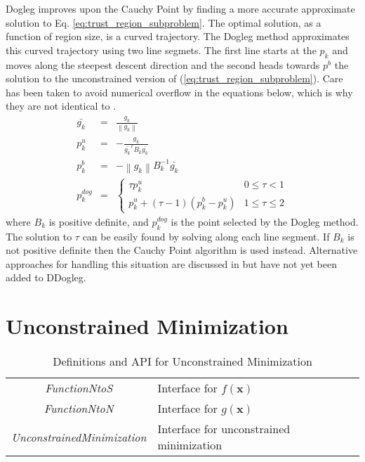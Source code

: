 \documentclass[peerreview,onecolumn]{IEEEtran}
\newcommand{\norm}[1]{\left\lVert#1\right\rVert}
\begin{document}
Dogleg improves upon the Cauchy Point by finding a more accurate approximate solution to Eq. \ref{eq:trust_region_subproblem}. The optimal solution, as a function of region size, is a curved trajectory. The Dogleg method approximates this curved trajectory using two line segmets. The first line starts at the $p_k$ and moves along the steepest descent direction and the second heads towards $p^b$ the solution to the unconstrained version of (\ref{eq:trust_region_subproblem}). Care has been taken to avoid numerical overflow in the equations below, which is why they are not identical to \cite{numopt2006,IMM2004}.
\begin{eqnarray}
\bar{g_k} &=& \frac{g_k}{\norm{g_k}} \\
p^u_k &=& -\frac{g_k}{\bar{g_k}^T B_k \bar{g_k}} \\
p^b_k &=& -\norm{g_k}B^{-1}_k\bar{g_k} \\
p^{dog}_k &=&
\begin{cases}
	\tau p^u_k & 0 \le \tau < 1 \\
	p^u_k + (\tau -1)(p^b_k-p^u_k) & 1 \le \tau \le 2
\end{cases}
\end{eqnarray}
where $B_k$ is positive definite, and $p^{dog}_k$ is the point selected by the Dogleg method. The solution to $\tau$ can be easily found by solving along each line segment. If $B_k$ is not positive definite then the Cauchy Point algorithm is used instead. Alternative approaches for handling this situation are discussed in \cite{numopt2006} but have not yet been added to DDogleg.

\section{Unconstrained Minimization}

\begin{table}[h]
\centering
\caption{\label{definitions:UM}Definitions and API for Unconstrained Minimization}
\begin{tabular}{cl}
\textit{FunctionNtoS} & Interface for $f(\bm{x})$ \\
\textit{FunctionNtoN} & Interface for $g(\bm{x})$ \\
\textit{UnconstrainedMinimization} & Interface for unconstrained minimization
\end{tabular}
\end{table}
\end{document}
